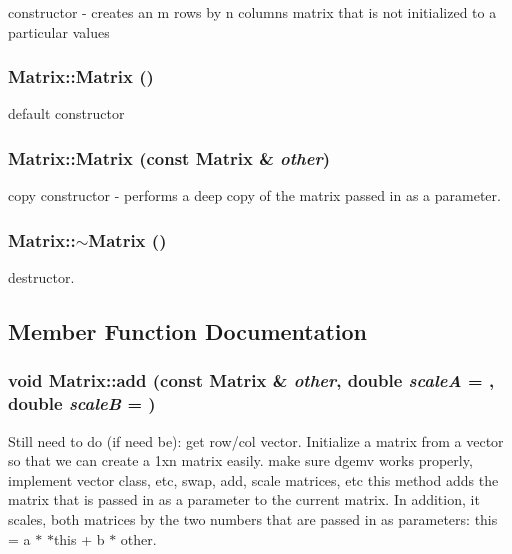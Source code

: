 constructor -\/ creates an m rows by n columns matrix that is not initialized to a particular values \hypertarget{classCartWheel_1_1Math_1_1Matrix_a2dba13c45127354c9f75ef576f49269b}{
\subsubsection[{Matrix}]{\setlength{\rightskip}{0pt plus 5cm}Matrix::Matrix ()}}
\label{classCartWheel_1_1Math_1_1Matrix_a2dba13c45127354c9f75ef576f49269b}
default constructor \hypertarget{classCartWheel_1_1Math_1_1Matrix_abcf708e864ed3d9db2c3b317c5e529ab}{
\subsubsection[{Matrix}]{\setlength{\rightskip}{0pt plus 5cm}Matrix::Matrix (const {\bf Matrix} \& {\em other})}}
\label{classCartWheel_1_1Math_1_1Matrix_abcf708e864ed3d9db2c3b317c5e529ab}
copy constructor -\/ performs a deep copy of the matrix passed in as a parameter. \hypertarget{classCartWheel_1_1Math_1_1Matrix_a9b1c3627f573d78a2f08623fdfef990f}{
\subsubsection[{$\sim$Matrix}]{\setlength{\rightskip}{0pt plus 5cm}Matrix::$\sim$Matrix ()}}
\label{classCartWheel_1_1Math_1_1Matrix_a9b1c3627f573d78a2f08623fdfef990f}
destructor. 

\subsection{Member Function Documentation}
\hypertarget{classCartWheel_1_1Math_1_1Matrix_ad8f3a5082ed8bc533638def9177c5a4e}{
\subsubsection[{add}]{\setlength{\rightskip}{0pt plus 5cm}void Matrix::add (const {\bf Matrix} \& {\em other}, \/  double {\em scaleA} = {}, \/  double {\em scaleB} = {})}}
\label{classCartWheel_1_1Math_1_1Matrix_ad8f3a5082ed8bc533638def9177c5a4e}
Still need to do (if need be): get row/col vector. Initialize a matrix from a vector so that we can create a 1xn matrix easily. make sure dgemv works properly, implement vector class, etc, swap, add, scale matrices, etc this method adds the matrix that is passed in as a parameter to the current matrix. In addition, it scales, both matrices by the two numbers that are passed in as parameters: this = a $\ast$ $\ast$this + b $\ast$ other.

